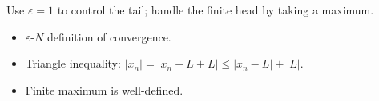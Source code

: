 \begin{remark*}
Use $\varepsilon = 1$ to control the tail; handle the finite head by taking a maximum.
\end{remark*}

\begin{remark*}[Dependencies]
\begin{itemize}
  \item $\varepsilon$-$N$ definition of convergence.
  \item Triangle inequality: $|x_n| = |x_n - L + L| \le |x_n - L| + |L|$.
  \item Finite maximum is well-defined.
\end{itemize}
\end{remark*}
